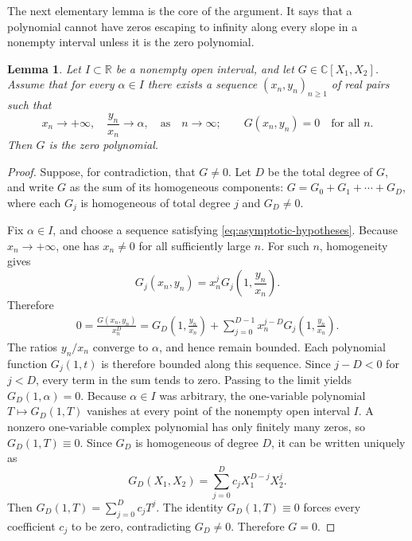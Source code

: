 \documentclass[reqno, 12pt]{article}
\numberwithin{equation}{section}
\newtheorem{lemma}[theorem]{Lemma}
\theoremstyle{definition}
\newcommand{\CC}{\mathbb{C}}
\begin{document}
The next elementary lemma is the core of the argument. It says that a polynomial cannot have zeros escaping to infinity along every
slope in a nonempty interval unless it is the zero polynomial.

\begin{lemma}\label{lem:asymptotic-vanishing}
Let $I\subset\mathbb R$ be a nonempty open interval, and let
$G\in\CC[X_1,X_2]$.  Assume that for every $\alpha\in I$ there exists a
sequence $(x_n,y_n)_{n\ge1}$ of real pairs such that
\begin{equation}\label{eq:asymptotic-hypotheses}
  x_n\longrightarrow+\infty,
  \quad
  \frac{y_n}{x_n}\longrightarrow\alpha,\quad \text{as}\quad n\longrightarrow\infty;
  \qquad
  G(x_n,y_n)=0
  \quad\text{for all }n.
\end{equation}
Then $G$ is the zero polynomial.
\end{lemma}

\begin{proof}
Suppose, for contradiction, that $G\neq0$.  Let $D$ be the total degree of
$G$, and write $G$ as the sum of its homogeneous components: $G=G_0+G_1+\cdots+G_D$,
where each $G_j$ is homogeneous of total degree $j$ and $G_D\neq0$.

Fix $\alpha\in I$, and choose a sequence satisfying
\cref{eq:asymptotic-hypotheses}.  Because $x_n\to+\infty$, one has
$x_n\neq0$ for all sufficiently large $n$.  For such $n$, homogeneity gives
\[G_j(x_n,y_n) =x_n^jG_j\!\left(1,\frac{y_n}{x_n}\right).
\]
Therefore
\begin{align*}
 0 =\frac{G(x_n,y_n)}{x_n^D}=G_D\!\left(1,\frac{y_n}{x_n}\right)+\sum_{j=0}^{D-1}x_n^{j-D}G_j\!\left(1,\frac{y_n}{x_n}\right).
\end{align*}
The ratios $y_n/x_n$ converge to $\alpha$, and hence remain bounded.  Each
polynomial function $G_j(1,t)$ is therefore bounded along this sequence.
Since $j-D<0$ for $j<D$, every term in the sum tends to zero.  Passing to the
limit yields $G_D(1,\alpha)=0$.
Because $\alpha\in I$ was arbitrary, the one-variable polynomial $T\longmapsto G_D(1,T)$ vanishes at every point of the nonempty open interval $I$.  A nonzero one-variable complex polynomial has only finitely many zeros, so $G_D(1,T)\equiv0$.
Since $G_D$ is homogeneous of degree $D$, it can be written uniquely as
\[G_D(X_1,X_2) =\sum_{j=0}^{D}c_jX_1^{D-j}X_2^j.
\]
Then $G_D(1,T)=\sum_{j=0}^{D}c_jT^j$.
The identity $G_D(1,T)\equiv0$ forces every coefficient $c_j$ to be zero,
contradicting $G_D\neq0$.  Therefore $G=0$.
\end{proof}
\end{document}
